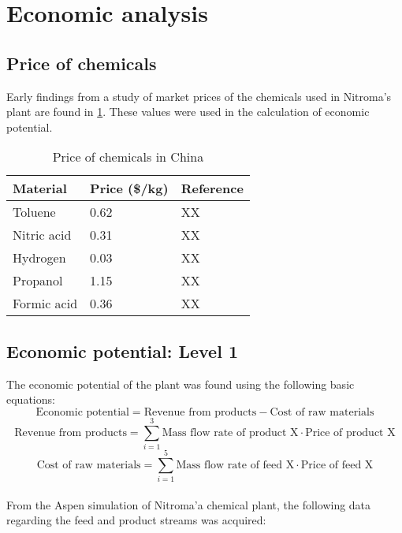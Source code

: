 \section{Economic analysis}
\label{app:economics}
\subsection{Price of chemicals}

Early findings from a study of market prices of the chemicals used in Nitroma's plant are found in \cref{tab:material-prices}. These values were used in the calculation of economic potential.

\begin{table}[h] 
\centering
\caption{Price of chemicals in China}
\label{tab:material-prices}
\begin{tabular}{lll}
    \toprule
    Material    & Price (\$/kg) & Reference \\ \midrule
    Toluene     & 0.62          & XX        \\
    Nitric acid & 0.31          & XX        \\
    Hydrogen    & 0.03         & XX        \\
    Propanol    & 1.15          & XX        \\
    Formic acid & 0.36          & XX        \\ \bottomrule
\end{tabular}
\end{table}

\subsection{Economic potential: Level 1}
The economic potential of the plant was found using the following basic equations:
\begin{equation}
    \text{Economic potential} = \text{Revenue from products} - \text{Cost of raw materials}
\end{equation}
\begin{equation}
    \text{Revenue from products} = \displaystyle\sum_{i=1}^{3} \text{Mass flow rate of product X} \cdot \text{Price of product X}
\end{equation}
\begin{equation}
    \text{Cost of raw materials} = \displaystyle\sum_{i=1}^{5} \text{Mass flow rate of feed X} \cdot \text{Price of feed X}
\end{equation}
\\
From the Aspen simulation of Nitroma'a chemical plant, the following data regarding the feed and product streams was acquired:

